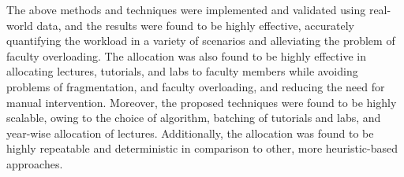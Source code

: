 The above methods and techniques were implemented and validated using real-world data, and the results were found to be highly effective, accurately quantifying the workload in a variety of scenarios and alleviating the problem of faculty overloading. The allocation was also found to be highly effective in allocating lectures, tutorials, and labs to faculty members while avoiding problems of fragmentation, and faculty overloading, and reducing the need for manual intervention. Moreover, the proposed techniques were found to be highly scalable, owing to the choice of algorithm, batching of tutorials and labs, and year-wise allocation of lectures. Additionally, the allocation was found to be highly repeatable and deterministic in comparison to other, more heuristic-based approaches.

